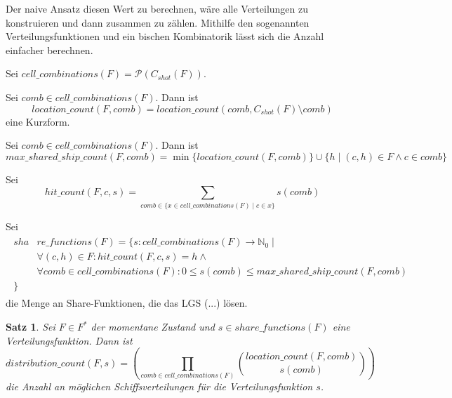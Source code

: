 \documentclass[a4paper,12pt]{llncs}
\newcommand{\N}{{\mathbb{N}}}
\numberwithin{equation}{section}
\newtheorem{satz}{Satz}
\begin{document}
Der naive Ansatz diesen Wert zu berechnen, wäre alle Verteilungen zu konstruieren und dann zusammen zu zählen.
Mithilfe den sogenannten Verteilungsfunktionen und ein bischen Kombinatorik lässt sich die Anzahl einfacher berechnen.

\begin{definition}
Sei $cell\_combinations(F)=\mathcal{P}(C_{shot}(F))$.
\end{definition}

\begin{definition}
Sei $comb \in cell\_combinations(F)$. Dann ist
\[
location\_count(F,comb)=location\_count(comb, C_{shot}(F) \setminus comb)
\]
eine Kurzform.
\end{definition}

\begin{definition}
Sei $comb \in cell\_combinations(F)$. Dann ist
\[
max\_shared\_ship\_count(F,comb)=\min\{location\_count(F, comb)\} \cup \{h \mid (c,h) \in F \wedge c \in comb\}
\]
\end{definition}

\begin{definition}
Sei
\[
hit\_count(F, c, s)=\sum_{comb \in \{x \in cell\_combinations(F) \mid c \in x\}}{s(comb)}
\]
\end{definition}

\begin{definition}
Sei
\begin{align}
\begin{split}
sha&re\_functions(F)=\{s \colon cell\_combinations(F) \rightarrow \N_0 \mid\\
&\forall{(c,h) \in F}\colon hit\_count(F, c, s)=h \wedge \\
&\forall{comb \in cell\_combinations(F)} \colon 0 \leq s(comb) \leq max\_shared\_ship\_count(F, comb)\\
\}\;\;\;& \nonumber
\end{split}
\end{align}
die Menge an Share-Funktionen, die das LGS (...) lösen.
\end{definition}

\begin{satz}
Sei $F\in F^*$ der momentane Zustand und $s \in share\_functions(F)$ eine Verteilungsfunktion.
Dann ist
\[
distribution\_count(F, s)=
\left( \prod_{comb \in cell\_combinations(F)}{{location\_count(F, comb)\choose s(comb)}} \right)
\]
die Anzahl an möglichen Schiffsverteilungen für die Verteilungsfunktion $s$.
\end{satz}
\end{document}
